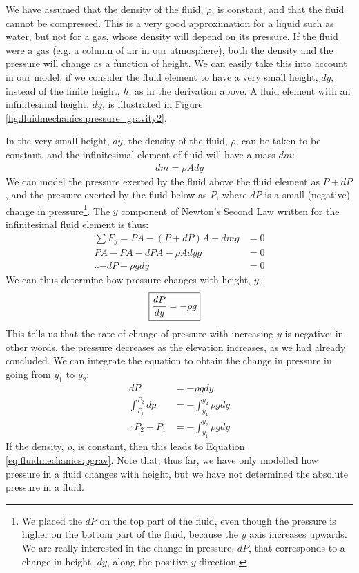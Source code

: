 We have assumed that the density of the fluid, $\rho$, is constant, and that the fluid cannot be compressed. This is a very good approximation for a liquid such as water, but not for a gas, whose density will depend on its pressure. If the fluid were a gas (e.g. a column of air in our atmosphere), both the density and the pressure will change as a function of height. We can easily take this into account in our model, if we consider the fluid element to have a very small height, $dy$, instead of the finite height, $h$, as in the derivation above. A fluid element with an infinitesimal height, $dy$, is illustrated in Figure \ref{fig:fluidmechanics:pressure_gravity2}.

 In the very small height, $dy$, the density of the fluid, $\rho$, can be taken to be constant, and the infinitesimal element of fluid will have a mass $dm$:
\begin{align*}
dm = \rho A dy
\end{align*}
We can model the pressure exerted by the fluid above the fluid element as $P+dP$, and the pressure exerted by the fluid below as $P$, where $dP$ is a small (negative) change in pressure\footnote{We placed the $dP$ on the top part of the fluid, even though the pressure is higher on the bottom part of the fluid, because the $y$ axis increases upwards. We are really interested in the change in pressure, $dP$, that corresponds to a change in height, $dy$, along the positive $y$ direction. }. The $y$ component of Newton's Second Law written for the infinitesimal fluid element is thus:
\begin{align*}
\sum F_y = PA - (P+dP)A -dm g &=0\\
PA -PA -dPA - \rho A dy g &=0\\
\therefore -dP -\rho gdy &=0
\end{align*}
We can thus determine how pressure changes with height, $y$:
\begin{align}
\Aboxed{\frac{dP}{dy} &= -\rho g}
\end{align}
This tells us that the rate of change of pressure with increasing $y$ is negative; in other words, the pressure decreases as the elevation increases, as we had already concluded. We can integrate the equation to obtain the change in pressure in going from $y_1$ to $y_2$:
\begin{align*}
dP &= -\rho g dy\\
\int_{P_1}^{P_2} dp&=-\int_{y_1}^{y_2}\rho gdy\\
\therefore P_2-P_1 &=-\int_{y_1}^{y_2}\rho gdy
\end{align*}
If the density, $\rho$, is constant, then this leads to Equation \ref{eq:fluidmechanics:pgrav}. Note that, thus far, we have only modelled how pressure in a fluid changes with height, but we have not determined the absolute pressure in a fluid. 


